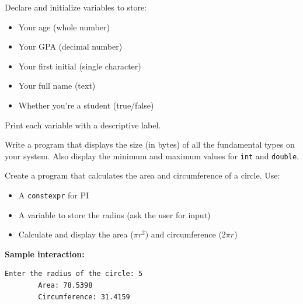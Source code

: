 \begin{example}{\leavevmode}
	
	Declare and initialize variables to store:
	\begin{itemize}
		\item Your age (whole number)
		\item Your GPA (decimal number)
		\item Your first initial (single character)
		\item Your full name (text)
		\item Whether you're a student (true/false)
	\end{itemize}
	
	Print each variable with a descriptive label.
\end{example}

\begin{example}{\leavevmode}
	
	Write a program that displays the size (in bytes) of all the fundamental types on your system. Also display the minimum and maximum values for \texttt{int} and \texttt{double}.
\end{example}

\begin{example}{\leavevmode}
	
	Create a program that calculates the area and circumference of a circle. Use:
	\begin{itemize}
		\item A \texttt{constexpr} for PI
		\item A variable to store the radius (ask the user for input)
		\item Calculate and display the area ($\pi r^2$) and circumference ($2\pi r$)
	\end{itemize}
	
	\textbf{Sample interaction:}
	\begin{lstlisting}[numbers=none]
		Enter the radius of the circle: 5
		Area: 78.5398
		Circumference: 31.4159
	\end{lstlisting}
\end{example}

